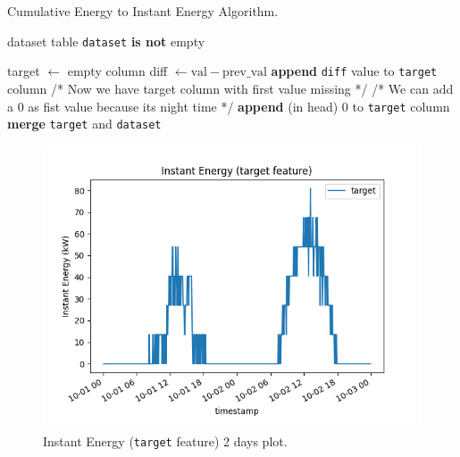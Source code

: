 
\begin{algorithm}[H]
	\caption{Cumulative Energy to Instant Energy Algorithm.}\label{alg:cumtoinstant}
	\begin{algorithmic}
		\Require dataset table
		\Ensure \texttt{dataset} \textbf{is not} empty

		\State target $\gets$ empty column
		\State diff $\gets \text{val} - \text{prev\_val}$
		\State \textbf{append} \texttt{diff} value to \texttt{target} column
		\EndFor
		\State /* Now we have target column with first value missing */
		\State /* We can add a 0 as fist value because its night time */
		\State \textbf{append} (in head) 0 to \texttt{target} column
		\State \textbf{merge} \texttt{target} and \texttt{dataset}
	\end{algorithmic}
\end{algorithm}

\begin{figure}[H]
	\centering
	\includegraphics[width=\linewidth, keepaspectratio]{chapters/2_data_preprocessing/imgs/targetfeature.png}
	\caption{Instant Energy (\texttt{target} feature) 2 days plot.}\label{fig:targetfeature}
\end{figure}


